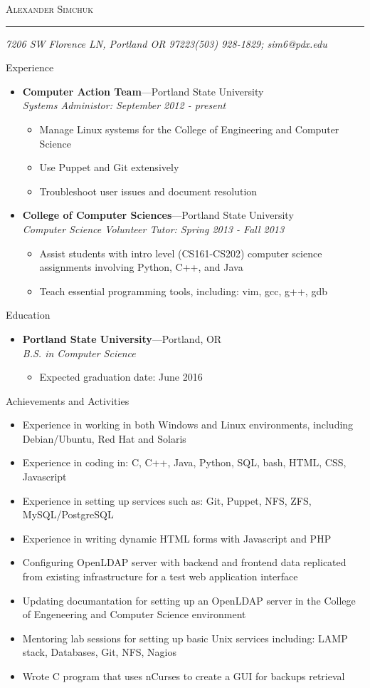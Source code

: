 \documentclass[11pt,oneside]{article}
\makeatletter
\newcommand{\name}{Alexander Simchuk}
\newcommand{\addr}{7206 SW Florence LN, Portland OR 97223}
\newcommand{\phone}{(503) 928-1829}
\newcommand{\email}{sim6@pdx.edu}
\newcommand{\bigname}[1]{
	\begin{center}\fontfamily{phv}\selectfont\Huge\scshape#1\end{center}
}
\newenvironment{ressection}[1]{
	\vspace{4pt}
	{\fontfamily{phv}\selectfont\Large#1}
	\begin{itemize}
	\vspace{3pt}
}{
	\end{itemize}
}
\newcommand{\resitem}[1]{
	\vspace{-4pt}
	\item \begin{flushleft} #1 \end{flushleft}
}
\newcommand{\ressubitem}[1]{
	\vspace{-1pt}
	\item \begin{flushleft} #1 \end{flushleft}
}
\newcommand{\resbigitem}[3]{
	\vspace{-5pt}
	\item
	\textbf{#1}---#2 \\
	\textit{#3}
}
\newenvironment{ressubsec}[3]{
	\resbigitem{#1}{#2}{#3}
	\vspace{-2pt}
	\begin{itemize}
}{
	\end{itemize}
}
\makeatother
\begin{document}
 \selectfont
\bigname{\name}
\vspace{-8pt} \rule{\textwidth}{1pt}
\vspace{-1pt} {\small\itshape \addr \hfill \phone; \email}
\vspace{8 pt}


\begin{ressection}{Experience}
    \begin{ressubsec}{Computer Action Team}{Portland State University}{Systems Administor: September 2012 - present}
		\ressubitem{Manage Linux systems for the College of Engineering and Computer Science}
		\ressubitem{Use Puppet and Git extensively}
		\ressubitem{Troubleshoot user issues and document resolution}
	\end{ressubsec}
	\begin{ressubsec}{College of Computer Sciences}{Portland State University}{Computer Science Volunteer Tutor: Spring 2013 - Fall 2013}
        \ressubitem{Assist students with intro level (CS161-CS202) computer science assignments involving Python, C++, and Java}
        \ressubitem{Teach essential programming tools, including: vim, gcc, g++, gdb}
	\end{ressubsec}
\end{ressection}


\begin{ressection}{Education}
    \begin{ressubsec}{Portland State University}{Portland, OR}{B.S. in Computer Science}
		\ressubitem{Expected graduation date: June 2016}
	\end{ressubsec}
\end{ressection}


\begin{ressection}{Achievements and Activities}
    \resitem{Experience in working in both Windows and Linux environments, including Debian/Ubuntu, Red Hat and Solaris}
    \resitem{Experience in coding in: C, C++, Java, Python, SQL, bash, HTML, CSS, Javascript}
    \resitem{Experience in setting up services such as: Git, Puppet, NFS, ZFS, MySQL/PostgreSQL}
    \resitem{Experience in writing dynamic HTML forms with Javascript and PHP}
    \resitem{Configuring OpenLDAP server with backend and frontend data replicated from existing infrastructure for a test web application interface}
    \resitem{Updating documantation for setting up an OpenLDAP server in the College of Engeneering and Computer Science environment}
    \resitem{Mentoring lab sessions for setting up basic Unix services including: LAMP stack, Databases, Git, NFS, Nagios}
    \resitem{Wrote C program that uses nCurses to create a GUI for backups retrieval}
\end{ressection}
\end{document}

